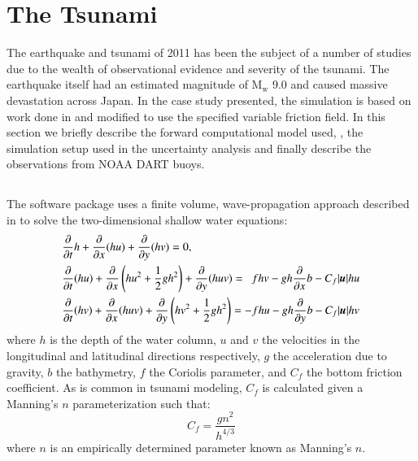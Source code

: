 
\section{The \tohoku Tsunami} 
\label{sec:tohoku}

The \tohoku earthquake and tsunami of 2011 has been the subject of a number of
studies due to the wealth of observational evidence and severity of the tsunami.
The earthquake itself had an estimated magnitude of $\text{M}_\text{w}$ 9.0 and
caused massive devastation across Japan.  In the case study presented, the
simulation is based on work done in \cite{MacInnes:2013cr} and modified to use
the specified variable friction field. In this section we briefly describe the
forward computational model used, \geoclaw, the  simulation setup used in the
uncertainty analysis and finally describe the observations from NOAA DART buoys.

\subsection{\geoclaw} \label{ssub:geoclaw}
The \geoclaw software package uses a finite volume, wave-propagation approach described in \cite{LeVeque:1997eg} to solve the two-dimensional shallow water equations:
\begin{equation} \label{eq:swe}
    \begin{aligned}
    &\pd{}{t} h + \pd{}{x} (hu) + \pd{}{y} (hv) = 0, \\
    &\pd{}{t}(hu) + \pd{}{x} \left(hu^2 + \frac{1}{2} g h^2 \right ) + \pd{}{y} (huv) = ~~ fhv - gh \pd{}{x} b - C_f |\vec{u}| hu \\
    &\pd{}{t} (hv) + \pd{}{x} (huv) + \pd{}{y} \left (hv^2 + \frac{1}{2} gh^2 \right) = -fhu - gh \pd{}{y} b - C_f |\vec{u}| hv
    \end{aligned}
\end{equation}
where $h$ is the depth of the water column, $u$ and $v$ the velocities in the 
longitudinal and latitudinal directions respectively, $g$ the acceleration due 
to gravity, $b$ the bathymetry, $f$ the Coriolis parameter, and $C_f$ the bottom 
friction coefficient.  As is common in tsunami modeling, $C_f$ is calculated 
given a Manning's $n$ parameterization such that:
\begin{equation}
    C_f = \frac{g n^2}{h^{4/3}}
\label{eq:coef}
\end{equation}
where $n$ is an empirically determined parameter known as Manning's $n$.  

